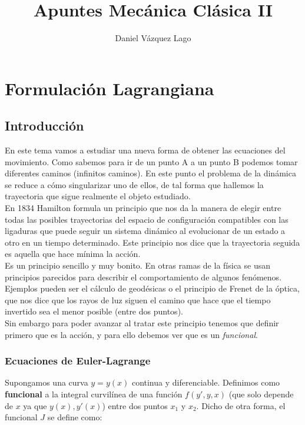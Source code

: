 \documentclass[12pt,a4paper]{book}
\author{Daniel Vázquez Lago}
\title{Apuntes Mecánica Clásica II}
\begin{document}
\maketitle

\newpage

\tableofcontents

\newpage

\chapter{Formulación Lagrangiana}
\section{Introducción}

En este tema vamos a estudiar una nueva forma de obtener las ecuaciones del movimiento. Como sabemos para ir de un punto A a un punto B podemos tomar diferentes caminos (infinitos caminos). En este punto el problema de la dinámica se reduce a cómo singularizar uno de ellos, de tal forma que hallemos la trayectoria que sigue realmente el objeto estudiado. \\

En 1834 Hamilton formula un principio que nos da la manera de elegir entre todas las posibles trayectorias del espacio de configuración compatibles con las ligaduras que puede seguir un sistema dinámico al evolucionar de un estado a otro en un tiempo determinado. Este principio nos dice que la trayectoria seguida es aquella que hace mínima la acción. \\

Es un principio sencillo y muy bonito. En otras ramas de la física se usan principios parecidos para describir el comportamiento de algunos fenómenos. Ejemplos pueden ser el cálculo de geodésicas o el principio de Frenet de la óptica, que nos dice que los rayos de luz siguen el camino que hace que el tiempo invertido sea el menor posible (entre dos puntos). \\

Sin embargo para poder avanzar al tratar este principio tenemos que definir primero que es la acción, y para ello debemos ver que es un \textit{funcional}.

\subsection{Ecuaciones de Euler-Lagrange}

Supongamos una curva $y=y(x)$ continua y diferenciable. Definimos como \textbf{funcional} a la integral curvilínea de una función $f(y',y,x)$ (que solo depende de $x$ ya que $y(x),y'(x)$) entre dos puntos $x_1$ y $x_2$. Dicho de otra forma, el funcional $J$ se define como:
\end{document}
